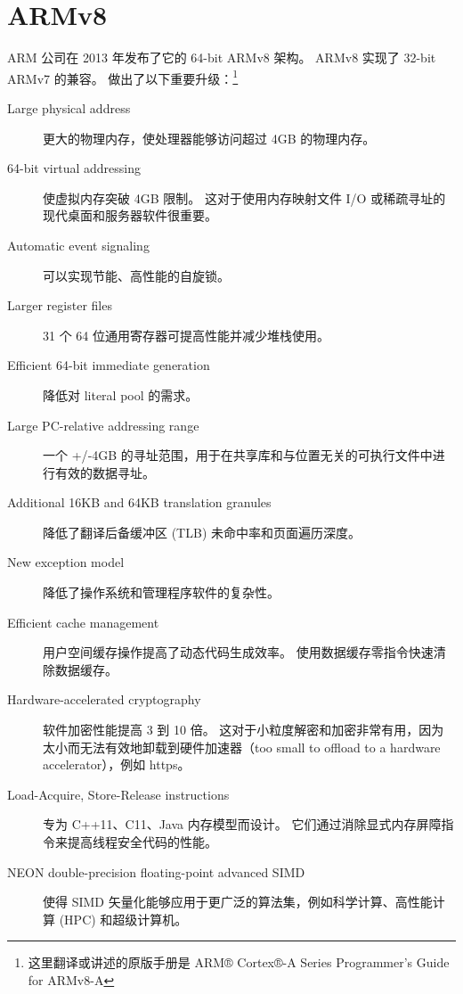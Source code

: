 \section{ARMv8}

ARM 公司在 2013 年发布了它的 64-bit ARMv8 架构。
ARMv8 实现了 32-bit ARMv7 的兼容。
做出了以下重要升级：\footnote{
  这里翻译或讲述的原版手册是 {ARM® Cortex®-A Series Programmer’s Guide for ARMv8-A}\cite{armpg}
}

\begin{description}
    \item[Large physical address] 更大的物理内存，使处理器能够访问超过 4GB 的物理内存。
    \item[64-bit virtual addressing] 使虚拟内存突破 4GB 限制。
    这对于使用内存映射文件 I/O 或稀疏寻址的现代桌面和服务器软件很重要。
    \item[Automatic event signaling] 可以实现节能、高性能的自旋锁。
    \item[Larger register files] 31 个 64 位通用寄存器可提高性能并减少堆栈使用。
    \item[Efficient 64-bit immediate generation] 降低对 literal pool 的需求。
    \item[Large PC-relative addressing range] 一个 +/‑4GB 的寻址范围，用于在共享库和与位置无关的可执行文件中进行有效的数据寻址。
    \item[Additional 16KB and 64KB translation granules] 降低了翻译后备缓冲区 (TLB) 未命中率和页面遍历深度。
    \item[New exception model] 降低了操作系统和管理程序软件的复杂性。
    \item[Efficient cache management] 用户空间缓存操作提高了动态代码生成效率。
    使用数据缓存零指令快速清除数据缓存。
    \item[Hardware-accelerated cryptography] 软件加密性能提高 3 到 10 倍。
      这对于小粒度解密和加密非常有用，因为太小而无法有效地卸载到硬件加速器（too small to offload to a hardware accelerator），例如 https。
    \item[Load-Acquire, Store-Release instructions] 专为 C++11、C11、Java 内存模型而设计。
    它们通过消除显式内存屏障指令来提高线程安全代码的性能。
    \item[NEON double-precision floating-point advanced SIMD] 使得 SIMD 矢量化能够应用于更广泛的算法集，例如科学计算、高性能计算 (HPC) 和超级计算机。
\end{description}


















